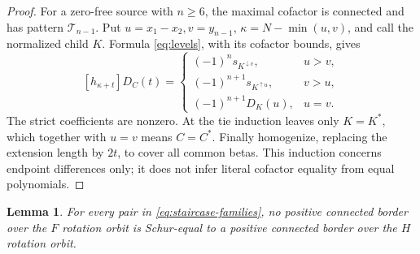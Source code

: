 \documentclass[11pt,a4paper]{amsart}
\numberwithin{equation}{section}
\theoremstyle{plain}
\newtheorem{lemma}[theorem]{Lemma}
\theoremstyle{definition}
\begin{document}
\begin{proof}
For a zero-free source with \(n\ge6\), the maximal cofactor is connected
and has pattern \(\mathcal T_{n-1}\).
Put \(u=x_1-x_2,v=y_{n-1}\), \(\kappa=N-\min(u,v)\), and call the
normalized child \(K\).  Formula \eqref{eq:levels}, with its cofactor
bounds, gives
\[
 [h_{\kappa+t}]D_C(t)=\begin{cases}
 (-1)^n s_{K^{\downarrow v}},&u>v,\\
 (-1)^{n+1}s_{K^{\uparrow u}},&v>u,\\
 (-1)^{n+1}D_K(u),&u=v.
 \end{cases}
\]
The strict coefficients are nonzero.  At the tie induction leaves only
\(K=K^*\), which together with \(u=v\) means \(C=C^*\).
Finally homogenize, replacing the extension length by \(2t\), to cover
all common betas.  This induction concerns endpoint differences only;
it does not infer literal cofactor equality from equal polynomials.
\end{proof}

\begin{lemma}\label{lem:staircase-border-separation}
For every pair in \eqref{eq:staircase-families}, no positive connected
border over the \(F\) rotation orbit is Schur-equal to a positive
connected border over the \(H\) rotation orbit.
\end{lemma}
\end{document}
